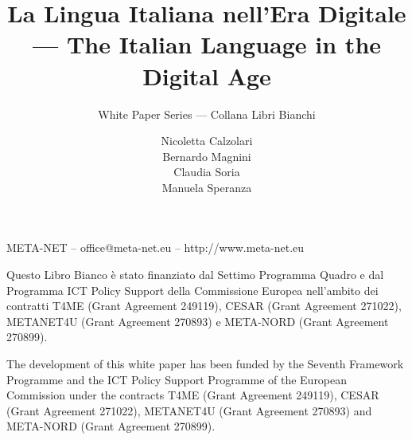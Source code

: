 \documentclass[]{../../metanetpaper}
\title{La Lingua Italiana nell'Era Digitale --- The Italian Language in the Digital Age}
\subtitle{White Paper Series --- Collana Libri Bianchi}
\author{
Nicoletta Calzolari\\
Bernardo Magnini\\
Claudia Soria\\
Manuela Speranza
}
\begin{document}
\renewcommand*{\figureformat}{\sffamily\thefigure\autodot}

\maketitle

\null
\pagestyle{empty} 

\centerline{META-NET -- office@meta-net.eu -- http://www.meta-net.eu}

\vfill

\begin{small}
  Questo Libro Bianco \`{e} stato finanziato dal Settimo Programma Quadro e dal Programma ICT Policy Support della Commissione Europea nell'ambito dei contratti T4ME (Grant Agreement 249119), CESAR (Grant Agreement 271022), METANET4U (Grant Agreement 270893) e META-NORD (Grant Agreement 270899).
\end{small}

\bigskip
\begin{small}
  The development of this white paper has been funded by the Seventh
  Framework Programme and the ICT Policy Support Programme of the
  European Commission under the contracts T4ME (Grant Agreement 249119),
  CESAR (Grant Agreement 271022), METANET4U (Grant Agreement 270893)
  and META-NORD (Grant Agreement 270899).
\end{small}

\clearpage

\setcounter{page}{5}
\pagestyle{scrheadings}

\cleardoublepage


\end{document}

